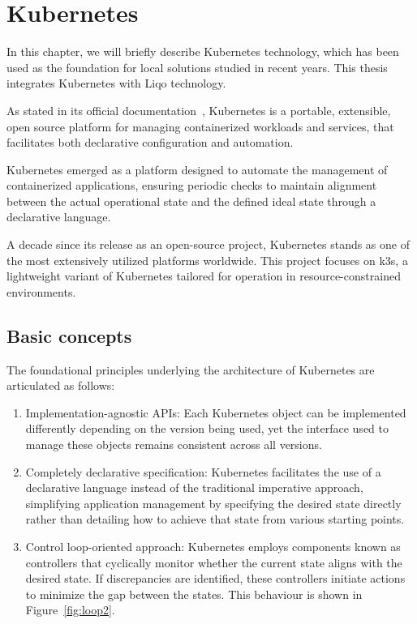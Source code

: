 \chapter{Kubernetes}
In this chapter, we will briefly describe Kubernetes technology, which has been used as the foundation for local solutions studied in recent years. This thesis integrates Kubernetes with Liqo technology.

As stated in its official documentation~\cite{k0-1}, Kubernetes is a portable, extensible, open source platform for managing containerized workloads and services, that facilitates both declarative configuration and automation.

Kubernetes emerged as a platform designed to automate the management of containerized applications, ensuring periodic checks to maintain alignment between the actual operational state and the defined ideal state through a declarative language.

A decade since its release as an open-source project, Kubernetes stands as one of the most extensively utilized platforms worldwide. This project focuses on k3s, a lightweight variant of Kubernetes tailored for operation in resource-constrained environments.

\section{Basic concepts}
The foundational principles underlying the architecture of Kubernetes are articulated as follows:
\begin{enumerate}
\item Implementation-agnostic APIs: Each Kubernetes object can be implemented differently depending on the version being used, yet the interface used to manage these objects remains consistent across all versions.
\item Completely declarative specification: Kubernetes facilitates the use of a declarative language instead of the traditional imperative approach, simplifying application management by specifying the desired state directly rather than detailing how to achieve that state from various starting points.
\item Control loop-oriented approach: Kubernetes employs components known as controllers that cyclically monitor whether the current state aligns with the desired state. If discrepancies are identified, these controllers initiate actions to minimize the gap between the states. This behaviour is shown in Figure~\ref{fig:loop2}.
\end{enumerate}

